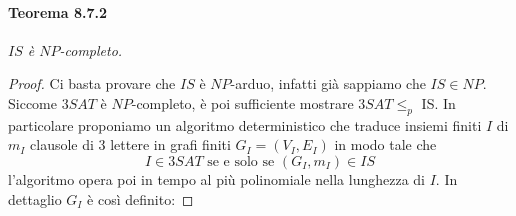 \paragraph*{Teorema 8.7.2} \textit{$IS$ è $NP$-completo.}
\begin{proof}
    Ci basta provare che $I S$ è $N P$-arduo, infatti già sappiamo che $I S \in N P$. Siccome $3 S A T$ è $N P$-completo, è poi sufficiente mostrare $3 S A T \leq_p$ IS. In particolare proponiamo un algoritmo deterministico che traduce insiemi finiti $I$ di $m_I$ clausole di 3 lettere in grafi finiti $G_I=\left(V_I, E_I\right)$ in modo tale che
    $$
        I \in 3 S A T \text { se e solo se }\left(G_I, m_I\right) \in I S
    $$
    l'algoritmo opera poi in tempo al più polinomiale nella lunghezza di $I$. In dettaglio $G_I$ è così definito:
\end{proof}